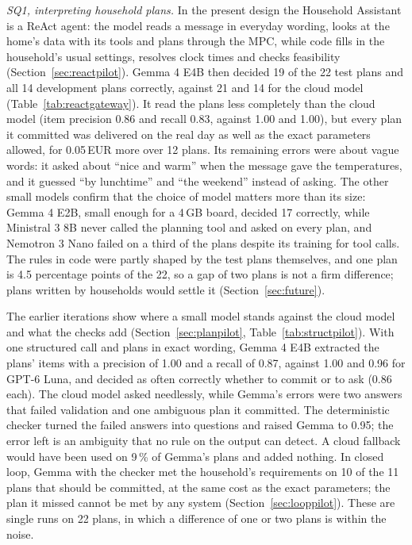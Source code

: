 \textit{SQ1, interpreting household plans.} In the present design the
Household Assistant is a ReAct agent: the model reads a message in
everyday wording, looks at the home's data with its tools and plans
through the MPC, while code fills in the household's usual settings,
resolves clock times and checks feasibility
(Section~\ref{sec:reactpilot}). Gemma 4 E4B then decided 19 of the 22
test plans and all 14 development plans correctly, against 21 and 14
for the cloud model (Table~\ref{tab:reactgateway}). It read the plans
less completely than the cloud model (item precision 0.86 and recall
0.83, against 1.00 and 1.00), but every plan it committed was delivered
on the real day as well as the exact parameters allowed, for 0.05\,EUR
more over 12 plans. Its remaining errors were about vague
words: it asked about ``nice and warm'' when the message gave the
temperatures, and it guessed ``by lunchtime'' and ``the weekend''
instead of asking. The other small models confirm that the choice of
model matters more than its size: Gemma 4 E2B, small enough for a 4\,GB
board, decided 17 correctly, while Ministral 3 8B never called the
planning tool and asked on every plan, and Nemotron 3 Nano failed on a
third of the plans despite its training for tool calls. The rules in
code were partly shaped by the test plans themselves, and one plan is
4.5 percentage points of the 22, so a gap of two plans is not a firm
difference; plans written by households would settle it
(Section~\ref{sec:future}).

The earlier iterations show where a small model stands against the
cloud model and what the checks add (Section~\ref{sec:planpilot},
Table~\ref{tab:structpilot}). With one structured call and plans in
exact wording, Gemma 4 E4B extracted the plans' items with a precision
of 1.00 and a recall of 0.87, against 1.00 and 0.96 for GPT-6 Luna, and
decided as often correctly whether to commit or to ask (0.86 each). The
cloud model asked needlessly, while Gemma's errors were two answers that
failed validation and one ambiguous plan it committed. The
deterministic checker turned the failed answers into questions and
raised Gemma to 0.95; the error left is an ambiguity that no rule on the
output can detect. A cloud fallback would have been used on 9\,\% of
Gemma's plans and added nothing. In closed loop, Gemma with the checker
met the household's requirements on 10 of the 11 plans that should be
committed, at the same cost as the exact parameters; the plan it missed
cannot be met by any system (Section~\ref{sec:looppilot}). These are single runs on 22 plans, in
which a difference of one or two plans is within the noise.

